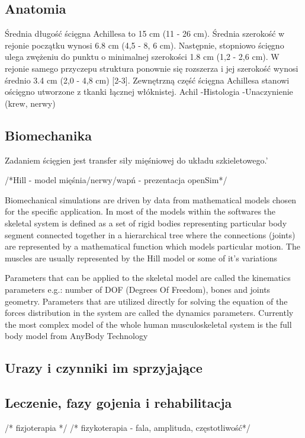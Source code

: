 \subsection{Anatomia}
Średnia długość ścięgna Achillesa to 15 cm (11 - 26 cm). Średnia szerokość w rejonie początku wynosi 6.8 cm (4,5 - 8, 6 cm). Następnie, stopniowo ścięgno ulega zwężeniu do punktu o minimalnej szerokości 1.8 cm (1,2 - 2,6 cm). W rejonie samego przyczepu struktura ponownie się rozszerza i jej szerokość wynosi średnio 3.4 cm (2,0 - 4,8 cm) [2-3].
Zewnętrzną część ścięgna Achillesa stanowi ościęgno utworzone z tkanki łącznej włóknistej.
Achil
-Histologia
-Unaczynienie (krew, nerwy)

\subsection{Biomechanika}
\label{Biomechanika}
Zadaniem ścięgien jest transfer siły mięśniowej do układu szkieletowego.'

/*Hill - model mięśnia/nerwy/wapń - prezentacja openSim*/

Biomechanical simulations are driven by data from mathematical models chosen for the specific application. In most of the models within the softwares the skeletal system is defined as a set of rigid bodies representing particular body segment connected together in a hierarchical tree where the connections (joints) are represented by a mathematical function which models particular motion. The muscles are usually represented by the Hill model or some of it’s variations \cite{}

Parameters that can be applied to the skeletal model are called the kinematics parameters e.g.: number of DOF (Degrees Of Freedom), bones and joints geometry. Parameters that are utilized directly for solving the equation of the forces distribution in the system are called the dynamics parameters. Currently the most complex model of the whole human musculoskeletal system is the full body model from AnyBody Technology \cite{}

\subsection{Urazy i czynniki im sprzyjające}
\subsection{Leczenie, fazy gojenia i rehabilitacja}
\label{gojenie}
/* fizjoterapia */
/* fizykoterapia - fala, amplituda, częstotliwość*/ 

